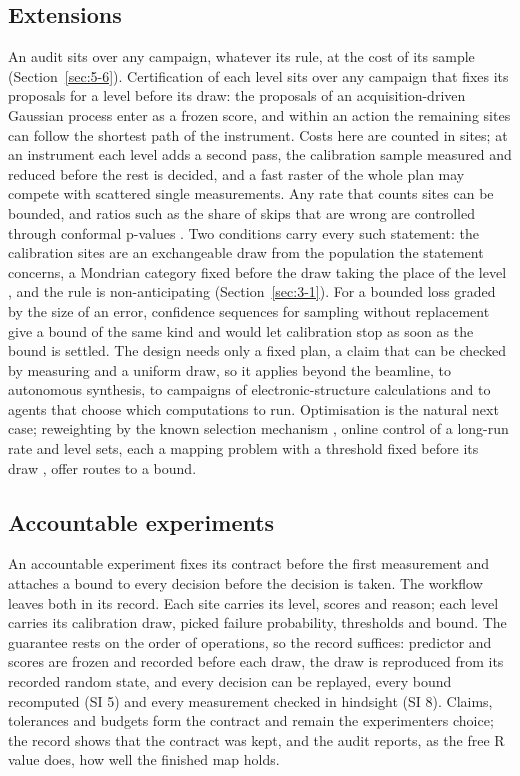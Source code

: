 \documentclass{iopjournal}
\begin{document}
\hypertarget{extensions}{%
\subsection{Extensions}\label{extensions}}

An audit sits over any campaign, whatever its rule, at the cost of its sample (Section~\ref{sec:5-6}). Certification of each level sits over any campaign that fixes its proposals for a level before its draw: the proposals of an acquisition-driven Gaussian process enter as a frozen score, and within an action the remaining sites can follow the shortest path of the instrument. Costs here are counted in sites; at an instrument each level adds a second pass, the calibration sample measured and reduced before the rest is decided, and a fast raster of the whole plan may compete with scattered single measurements. Any rate that counts sites can be bounded, and ratios such as the share of skips that are wrong are controlled through conformal p-values \cite{Jin2023}. Two conditions carry every such statement: the calibration sites are an exchangeable draw from the population the statement concerns, a Mondrian category fixed before the draw taking the place of the level \cite{Vovk2005}, and the rule is non-anticipating (Section~\ref{sec:3-1}). For a bounded loss graded by the size of an error, confidence sequences for sampling without replacement \cite{WaudbySmith2020} give a bound of the same kind and would let calibration stop as soon as the bound is settled. The design needs only a fixed plan, a claim that can be checked by measuring and a uniform draw, so it applies beyond the beamline, to autonomous synthesis, to campaigns of electronic-structure calculations and to agents that choose which computations to run. Optimisation is the natural next case; reweighting by the known selection mechanism \cite{Tibshirani2019,Fannjiang2022,Barber2023}, online control of a long-run rate \cite{Gibbs2021} and level sets, each a mapping problem with a threshold fixed before its draw \cite{CerouGuyader2007,Gotovos2013}, offer routes to a bound.

\hypertarget{accountable-experiments}{%
\subsection{Accountable experiments}\label{accountable-experiments}}

An accountable experiment fixes its contract before the first measurement and attaches a bound to every decision before the decision is taken. The workflow leaves both in its record. Each site carries its level, scores and reason; each level carries its calibration draw, picked failure probability, thresholds and bound. The guarantee rests on the order of operations, so the record suffices: predictor and scores are frozen and recorded before each draw, the draw is reproduced from its recorded random state, and every decision can be replayed, every bound recomputed (SI 5) and every measurement checked in hindsight (SI 8). Claims, tolerances and budgets form the contract and remain the experimenter\textquotesingle s choice; the record shows that the contract was kept, and the audit reports, as the free R value does, how well the finished map holds.
\end{document}
